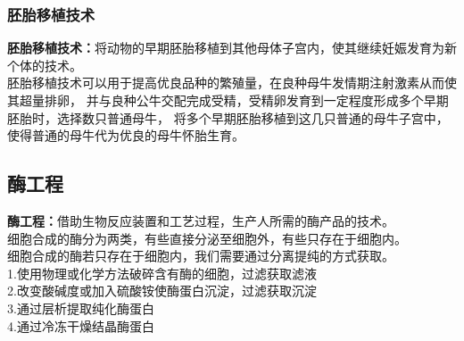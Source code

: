 \documentclass[UTF8]{ctexart}
\begin{document}
\subsubsection{胚胎移植技术}
    \textbf{胚胎移植技术：}将动物的早期胚胎移植到其他母体子宫内，使其继续妊娠发育为新个体的技术。\\[3mm]
    胚胎移植技术可以用于提高优良品种的繁殖量，在良种母牛发情期注射激素从而使其超量排卵，
    并与良种公牛交配完成受精，受精卵发育到一定程度形成多个早期胚胎时，选择数只普通母牛，
    将多个早期胚胎移植到这几只普通的母牛子宫中，使得普通的母牛代为优良的母牛怀胎生育。

\subsection{酶工程}
    \textbf{酶工程：}借助生物反应装置和工艺过程，生产人所需的酶产品的技术。\\[3mm]
    细胞合成的酶分为两类，有些直接分泌至细胞外，有些只存在于细胞内。\\[3mm]
    细胞合成的酶若只存在于细胞内，我们需要通过分离提纯的方式获取。\\[3mm]
    1.使用物理或化学方法破碎含有酶的细胞，过滤获取滤液\\[3mm]
    2.改变酸碱度或加入硫酸铵使酶蛋白沉淀，过滤获取沉淀\\[3mm]
    3.通过层析提取纯化酶蛋白\\[3mm]
    4.通过冷冻干燥结晶酶蛋白
    
\newpage
\end{document}
